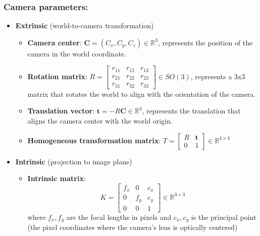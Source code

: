 \documentclass[12pt]{article}
\begin{document}
\subsubsection*{Camera parameters:}
\begin{itemize}
    \item \textbf{Extrinsic} (world-to-camera transformation)
        \begin{itemize}
            \item \textbf{Camera center}: \( \mathbf{C} = (C_x, C_y, C_z) \in \mathbb{R}^3 \), represents the position of the camera in the world coordinate.
            \item \textbf{Rotation matrix}: \( R =
                \begin{bmatrix}
                    r_{11} & r_{12} & r_{13} \\
                    r_{21} & r_{22} & r_{23} \\
                    r_{31} & r_{32} & r_{33}
                \end{bmatrix}
                \in SO(3) \), represents a 3x3 matrix that rotates the world to align with the orientation of the camera.
            \item \textbf{Translation vector}: \( \mathbf{t} = -R \mathbf{C} \in \mathbb{R}^3 \), represents the translation that aligns the camera center with the world origin.
            \item \textbf{Homogeneous transformation matrix}:
                \(T = \begin{bmatrix} R & \mathbf{t} \\ 0 & 1 \end{bmatrix} \in \mathbb{R}^{4 \times 4} \label{eq:extrinsic}\)
        \end{itemize}
    \item \textbf{Intrinsic} (projection to image plane)
        \begin{itemize}
            \item \textbf{Intrinsic matrix}:
            \begin{equation}
                K = \begin{bmatrix}
                    f_x & 0 & c_x \\
                    0 & f_y & c_y \\
                    0 & 0 & 1
                \end{bmatrix} \in \mathbb{R}^{3 \times 3} \label{eq:intrinsic}
            \end{equation}
            where \( f_x, f_y \) are the focal lengths in pixels and \( c_x, c_y \) is the principal point (the pixel coordinates where the camera's lens is optically centered)
        \end{itemize}
\end{itemize}
\end{document}
